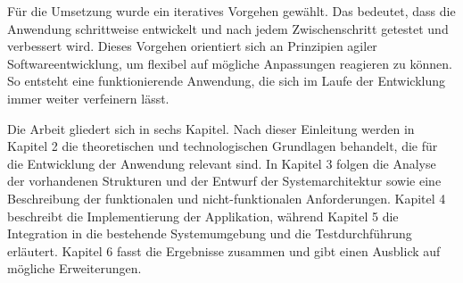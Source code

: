 Für die Umsetzung wurde ein iteratives Vorgehen gewählt.
Das bedeutet, dass die Anwendung schrittweise entwickelt und nach jedem Zwischenschritt getestet und verbessert wird.
Dieses Vorgehen orientiert sich an Prinzipien agiler Softwareentwicklung, um flexibel auf mögliche Anpassungen reagieren zu können.
So entsteht eine funktionierende Anwendung, die sich im Laufe der Entwicklung immer weiter verfeinern lässt.

Die Arbeit gliedert sich in sechs Kapitel.
Nach dieser Einleitung werden in Kapitel 2 die theoretischen und technologischen Grundlagen behandelt, die für die Entwicklung der Anwendung relevant sind.
In Kapitel 3 folgen die Analyse der vorhandenen Strukturen und der Entwurf der Systemarchitektur sowie eine Beschreibung der funktionalen und nicht-funktionalen Anforderungen.
Kapitel 4 beschreibt die Implementierung der Applikation, während Kapitel 5 die Integration in die bestehende Systemumgebung und die Testdurchführung erläutert.
Kapitel 6 fasst die Ergebnisse zusammen und gibt einen Ausblick auf mögliche Erweiterungen.



















